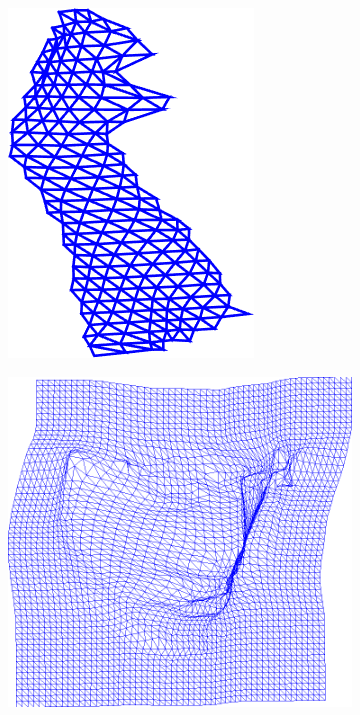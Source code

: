 \begin{figure}[t!]
\begin{subfigure}[b]{0.1\textwidth}
            \includegraphics[width=\textwidth]{resources/Fig_Flows/6}
    \end{subfigure}
    \hfill
    \begin{subfigure}[b]{0.1\textwidth}
            \includegraphics[width=\textwidth]{resources/Fig_Flows/7}

\end{subfigure}
\end{figure}
